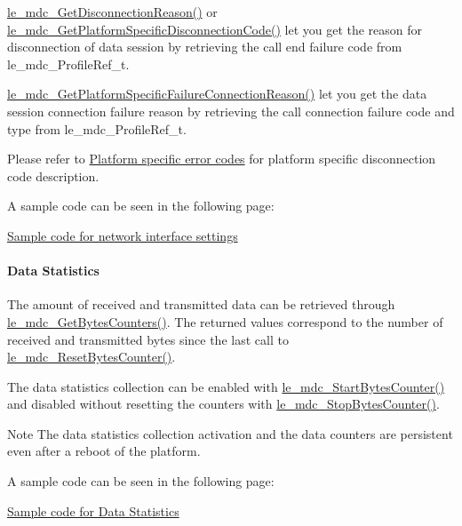 \hyperlink{le__mdc__interface_8h_afe73f44c23b1bd120dd82a85b36c6059}{le\+\_\+mdc\+\_\+\+Get\+Disconnection\+Reason()} or \hyperlink{le__mdc__interface_8h_a3e3a92b0f5e3edab9400412170517a62}{le\+\_\+mdc\+\_\+\+Get\+Platform\+Specific\+Disconnection\+Code()} let you get the reason for disconnection of data session by retrieving the call end failure code from {\ttfamily le\+\_\+mdc\+\_\+\+Profile\+Ref\+\_\+t}.

\hyperlink{le__mdc__interface_8h_a438ff354100b5020ace1059635b740b4}{le\+\_\+mdc\+\_\+\+Get\+Platform\+Specific\+Failure\+Connection\+Reason()} let you get the data session connection failure reason by retrieving the call connection failure code and type from {\ttfamily le\+\_\+mdc\+\_\+\+Profile\+Ref\+\_\+t}.

Please refer to \hyperlink{platformConstraintsSpecificErrorCodes}{Platform specific error codes} for platform specific disconnection code description.

A sample code can be seen in the following page\+:
\begin{DoxyItemize}
\item \hyperlink{c_mdcDataSessions}{Sample code for network interface settings}
\end{DoxyItemize}\hypertarget{c_SDD_mdc_le_mdc_dataStatistics}{}\paragraph{Data Statistics}\label{c_SDD_mdc_le_mdc_dataStatistics}
The amount of received and transmitted data can be retrieved through \hyperlink{le__mdc__interface_8h_aaad833c105f7d0ae77f18195d6739080}{le\+\_\+mdc\+\_\+\+Get\+Bytes\+Counters()}. The returned values correspond to the number of received and transmitted bytes since the last call to \hyperlink{le__mdc__interface_8h_a63636b2779d2ee6a6520ebfb2d26666c}{le\+\_\+mdc\+\_\+\+Reset\+Bytes\+Counter()}.

The data statistics collection can be enabled with \hyperlink{le__mdc__interface_8h_a30f390941d98c9e9c4144a5e035da3aa}{le\+\_\+mdc\+\_\+\+Start\+Bytes\+Counter()} and disabled without resetting the counters with \hyperlink{le__mdc__interface_8h_a1d6007bc8f84e5e4869af4af11b7363f}{le\+\_\+mdc\+\_\+\+Stop\+Bytes\+Counter()}.

\begin{DoxyNote}{Note}
The data statistics collection activation and the data counters are persistent even after a reboot of the platform.
\end{DoxyNote}
A sample code can be seen in the following page\+:
\begin{DoxyItemize}
\item \hyperlink{c_mdcDataStatistics}{Sample code for Data Statistics}
\end{DoxyItemize}






